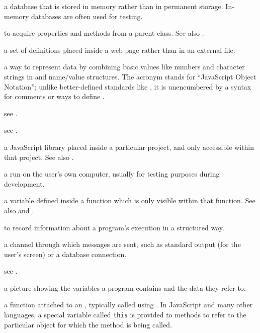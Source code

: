 \begin{description}
a database that is stored in memory rather than in permanent storage.
In-memory databases are often used for testing.

to acquire properties and methods from a parent class. See also
.

a set of  definitions placed inside a web page rather than in an
external file.

a way to represent data by combining basic values like numbers and character
strings in  and name/value structures. The acronym stands
for ``JavaScript Object Notation''; unlike better-defined standards like
, it is unencumbered by a syntax for comments or ways to define
.

see .

see .

a JavaScript library placed inside a particular project, and only accessible
within that project. See also .

a  run on the user's own computer, usually for testing
purposes during development.

a variable defined inside a function which is only visible within that
function. See also  and
.

to record information about a program's execution in a structured way.

a channel through which  messages are sent, such as
standard output (for the user's screen) or a database connection.

see .

a picture showing the variables a program contains and the data they refer to.

a function attached to an , typically called using . In JavaScript and many other languages, a
special variable called \texttt{this} is provided to methods to refer to the
particular object for which the method is being called.


\end{description}
